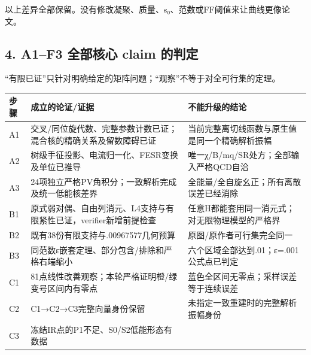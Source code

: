 \documentclass[
  11pt,
  a4paper,
]{article}
\newcounter{none} %
\begin{document}
以上差异全部保留。没有修改凝聚、质量、s₀、范数或FF阈值来让曲线更像论文。

\subsection{4. A1--F3 全部核心 claim
的判定}\label{a1f3-ux5168ux90e8ux6838ux5fc3-claim-ux7684ux5224ux5b9a}

``有限已证''只针对明确给定的矩阵问题；``观察''不等于对全可行集的定理。

{\def\LTcaptype{none} %
\begin{longtable}[]{@{}
  >{\raggedright\arraybackslash}p{}
  >{\raggedright\arraybackslash}p{}
  >{\raggedright\arraybackslash}p{}@{}}
\toprule\noalign{}
\begin{minipage}[b]{\linewidth}\raggedright
步骤
\end{minipage} & \begin{minipage}[b]{\linewidth}\raggedright
成立的论证/证据
\end{minipage} & \begin{minipage}[b]{\linewidth}\raggedright
不能升级的结论
\end{minipage} \\
\midrule\noalign{}
\endhead
\bottomrule\noalign{}
\endlastfoot
A1 & 交叉/同位旋代数、完整参数计数已证；混合核的精确关系及留数障碍已证 &
当前完整离切线函数与原生值是同一个精确解析振幅 \\
A2 & 树级手征投影、电流归一化、FESR变换及单位已推导 &
唯一χ/B/mq/SR处方；全部输入严格QCD自洽 \\
A3 & 24项独立严格PV角积分；一致解析完成及统一低能核差界 &
全能量/全自旋幺正；所有离散误差已经消除 \\
B1 & 原式弱对偶、自由列消元、L4支持与有限紧性已证，verifier新增前提检查
& 任意H都能套用同一消元式；对无限物理模型的严格界 \\
B2 & 既有38份有限支持与.00967577几何预算 & 原图/原作者可行集完全同一 \\
B3 & 同范数ε嵌套定理、部分包含/排除和严格右端缩小 &
六个区域全部达到.01；ε=.001公式点已判定 \\
C1 & 81点线性改善观察；本轮严格证明橙/绿变号区间内有零点 &
蓝色全区间无零点；采样误差等于连续误差 \\
C2 & C1→C2→C3完整向量身份保留 & 未指定一致重建时的完整解析振幅身份 \\
C3 & 冻结IR点的P1不足、S0/S2低能形态有数据 &

\end{longtable}}
\end{document}
